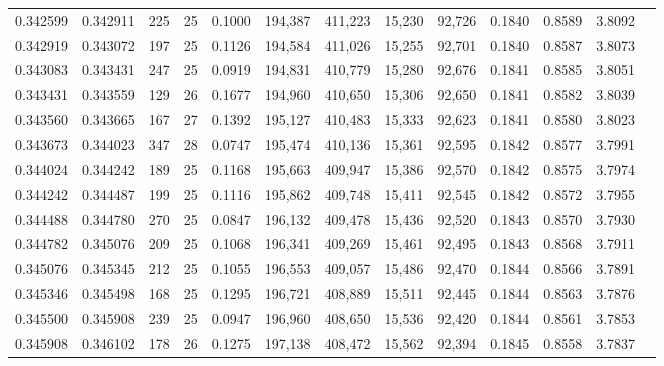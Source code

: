 \begin{tabular}{rrrrrrrrrrrrr}
0.342599 & 0.342911 &   225 &  25 &                                     0.1000 & 194,387 & 411,223 &  15,230 &  92,726 & 0.1840 & 0.8589 & 3.8092 \\
0.342919 & 0.343072 &   197 &  25 &                                     0.1126 & 194,584 & 411,026 &  15,255 &  92,701 & 0.1840 & 0.8587 & 3.8073 \\
0.343083 & 0.343431 &   247 &  25 &                                     0.0919 & 194,831 & 410,779 &  15,280 &  92,676 & 0.1841 & 0.8585 & 3.8051 \\
0.343431 & 0.343559 &   129 &  26 &                                     0.1677 & 194,960 & 410,650 &  15,306 &  92,650 & 0.1841 & 0.8582 & 3.8039 \\
0.343560 & 0.343665 &   167 &  27 &                                     0.1392 & 195,127 & 410,483 &  15,333 &  92,623 & 0.1841 & 0.8580 & 3.8023 \\
0.343673 & 0.344023 &   347 &  28 &                                     0.0747 & 195,474 & 410,136 &  15,361 &  92,595 & 0.1842 & 0.8577 & 3.7991 \\
0.344024 & 0.344242 &   189 &  25 &                                     0.1168 & 195,663 & 409,947 &  15,386 &  92,570 & 0.1842 & 0.8575 & 3.7974 \\
0.344242 & 0.344487 &   199 &  25 &                                     0.1116 & 195,862 & 409,748 &  15,411 &  92,545 & 0.1842 & 0.8572 & 3.7955 \\
0.344488 & 0.344780 &   270 &  25 &                                     0.0847 & 196,132 & 409,478 &  15,436 &  92,520 & 0.1843 & 0.8570 & 3.7930 \\
0.344782 & 0.345076 &   209 &  25 &                                     0.1068 & 196,341 & 409,269 &  15,461 &  92,495 & 0.1843 & 0.8568 & 3.7911 \\
0.345076 & 0.345345 &   212 &  25 &                                     0.1055 & 196,553 & 409,057 &  15,486 &  92,470 & 0.1844 & 0.8566 & 3.7891 \\
0.345346 & 0.345498 &   168 &  25 &                                     0.1295 & 196,721 & 408,889 &  15,511 &  92,445 & 0.1844 & 0.8563 & 3.7876 \\
0.345500 & 0.345908 &   239 &  25 &                                     0.0947 & 196,960 & 408,650 &  15,536 &  92,420 & 0.1844 & 0.8561 & 3.7853 \\
0.345908 & 0.346102 &   178 &  26 &                                     0.1275 & 197,138 & 408,472 &  15,562 &  92,394 & 0.1845 & 0.8558 & 3.7837 \\

\end{tabular}
